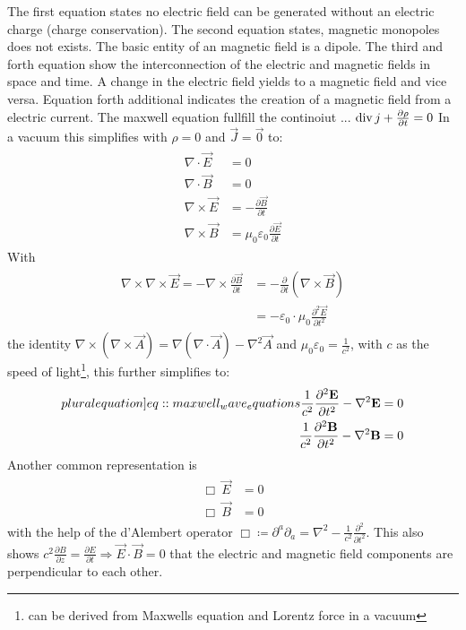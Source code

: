 % 
The first equation states no electric field can be generated without an electric charge (charge conservation).
The second equation states, magnetic monopoles does not exists. The basic entity of an magnetic field is a dipole.
The third and forth equation show the interconnection of the electric and magnetic fields in space and time. A change in the electric field yields to a magnetic field and vice versa. Equation forth additional indicates the creation of a magnetic field from a electric current. The maxwell equation fullfill the continoiut ... $\operatorname{div} j + \frac{\partial \rho}{\partial t} = 0$
% 
In a vacuum this simplifies with $\rho = 0$ and $\vec{J} = \vec{0}$ to:
% 
\begin{align}
\begin{split} \label{eq::maxwell_vacuum}
  \nabla \cdot \vec{E} &= 0 \quad\\
  \nabla \cdot \vec{B} &= 0 \quad\\
  \nabla \times \vec{E} &= -\frac{\partial\vec B}{\partial t}\\
  \nabla \times \vec{B} &= \mu_0\varepsilon_0 \frac{\partial\vec E}{\partial t}
  \end{split}
\end{align}
% 
With 
\begin{align}
\begin{split} 
    \nabla \times \nabla \times \vec{E} = -\nabla \times \frac{\partial \vec{B}} {\partial t} &= -\frac{\partial} {\partial t} \left( \nabla \times  \vec{B} \right)\\
    &= -\varepsilon_0 \cdot \mu_0 \frac{\partial^2 \vec{E}}{\partial t^2}
\end{split}
\end{align}
% 
the identity $\nabla \times \left( \nabla \times \vec{A} \right) = \nabla(\nabla \cdot \vec{A}) - \nabla^{2}\vec{A}$ and $\mu_0\varepsilon_0 = \frac{1}{c^2}$, with $c$ as the speed of light\footnote{can be derived from Maxwells equation and Lorentz force in a vacuum}, this further simplifies to:
% 
\begin{align}
\begin{split} \label[pluralequation]{eq::maxwell_wave_equations}
  \frac{1}{c^2} \frac{\partial^2 \vec{E}}{\partial t^2} - \nabla^2 \vec{E} &= 0 \\
  \frac{1}{c^2} \frac{\partial^2 \vec{B}}{\partial t^2} - \nabla^2 \vec{B} &= 0
\end{split}
\end{align}
% 
Another common representation is
% 
\begin{align}
\begin{split} \label{eq::maxwell_wave_equations_box}
  \Box \ \vec{E} &= 0 \\
  \Box \ \vec{B} &= 0
\end{split}
\end{align}
% 
with the help of the d'Alembert operator $\Box \coloneqq \partial^a\partial_a = \nabla^2 - \frac{1}{c^2} \frac{\partial^2}{\partial t^2}$.
% 
This also shows $c^2  \frac{\partial B} {\partial z} = \frac{\partial E}{\partial t} \Rightarrow \vec{E} \cdot \vec{B} = 0$ that the electric and magnetic field components are perpendicular to each other.
% 
